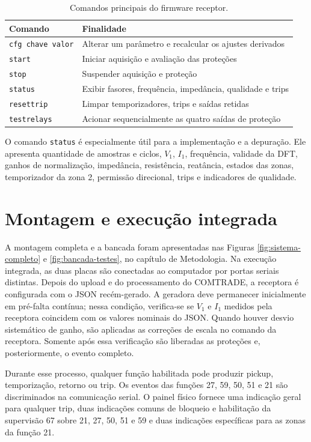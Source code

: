 \begin{table}[H]
  \centering
  \small
  \caption{Comandos principais do firmware receptor.}
  \label{tab:comandos-receptor}
  \begin{tabular}{ll}
    \toprule
    Comando & Finalidade \\
    \midrule
    \texttt{cfg chave valor} & Alterar um parâmetro e recalcular os ajustes derivados \\
    \texttt{start} & Iniciar aquisição e avaliação das proteções \\
    \texttt{stop} & Suspender aquisição e proteção \\
    \texttt{status} & Exibir fasores, frequência, impedância, qualidade e trips \\
    \texttt{resettrip} & Limpar temporizadores, trips e saídas retidas \\
    \texttt{testrelays} & Acionar sequencialmente as quatro saídas de proteção \\
    \bottomrule
  \end{tabular}
\end{table}

O comando \texttt{status} é especialmente útil para a implementação e a depuração. Ele apresenta quantidade de amostras e ciclos, $V_1$, $I_1$, frequência, validade da DFT, ganhos de normalização, impedância, resistência, reatância, estados das zonas, temporizador da zona 2, permissão direcional, trips e indicadores de qualidade.

\section{Montagem e execução integrada}

A montagem completa e a bancada foram apresentadas nas Figuras \ref{fig:sistema-completo} e \ref{fig:bancada-testes}, no capítulo de Metodologia. Na execução integrada, as duas placas são conectadas ao computador por portas seriais distintas. Depois do upload e do processamento do COMTRADE, a receptora é configurada com o JSON recém-gerado. A geradora deve permanecer inicialmente em pré-falta contínua; nessa condição, verifica-se se $V_1$ e $I_1$ medidos pela receptora coincidem com os valores nominais do JSON. Quando houver desvio sistemático de ganho, são aplicadas as correções de escala no comando da receptora. Somente após essa verificação são liberadas as proteções e, posteriormente, o evento completo.

Durante esse processo, qualquer função habilitada pode produzir pickup, temporização, retorno ou trip. Os eventos das funções 27, 59, 50, 51 e 21 são discriminados na comunicação serial. O painel físico fornece uma indicação geral para qualquer trip, duas indicações comuns de bloqueio e habilitação da supervisão 67 sobre 21, 27, 50, 51 e 59 e duas indicações específicas para as zonas da função 21.

